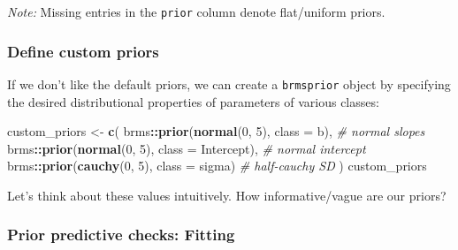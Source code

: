 \documentclass[
  11pt,
]{article}
\newenvironment{Shaded}{\begin{snugshade}}{\end{snugshade}}
\newcommand{\AttributeTok}[1]{\textcolor[rgb]{0.13,0.29,0.53}{#1}}
\newcommand{\CommentTok}[1]{\textcolor[rgb]{0.56,0.35,0.01}{\textit{#1}}}
\newcommand{\DecValTok}[1]{\textcolor[rgb]{0.00,0.00,0.81}{#1}}
\newcommand{\FunctionTok}[1]{\textcolor[rgb]{0.13,0.29,0.53}{\textbf{#1}}}
\newcommand{\NormalTok}[1]{#1}
\newcommand{\OtherTok}[1]{\textcolor[rgb]{0.56,0.35,0.01}{#1}}
\newcommand{\SpecialCharTok}[1]{\textcolor[rgb]{0.81,0.36,0.00}{\textbf{#1}}}
\begin{document}
\emph{Note:} Missing entries in the \texttt{prior} column denote flat/uniform priors.

\hypertarget{define-custom-priors}{%
\subsubsection{Define custom priors}\label{define-custom-priors}}

If we don't like the default priors, we can create a \texttt{brmsprior} object
by specifying the desired distributional properties of parameters of
various classes:

\begin{Shaded}
\begin{Highlighting}[]
\NormalTok{custom\_priors }\OtherTok{\textless{}{-}} \FunctionTok{c}\NormalTok{(}
\NormalTok{  brms}\SpecialCharTok{::}\FunctionTok{prior}\NormalTok{(}\FunctionTok{normal}\NormalTok{(}\DecValTok{0}\NormalTok{, }\DecValTok{5}\NormalTok{), }\AttributeTok{class =}\NormalTok{ b),          }\CommentTok{\# normal slopes}
\NormalTok{  brms}\SpecialCharTok{::}\FunctionTok{prior}\NormalTok{(}\FunctionTok{normal}\NormalTok{(}\DecValTok{0}\NormalTok{, }\DecValTok{5}\NormalTok{), }\AttributeTok{class =}\NormalTok{ Intercept),  }\CommentTok{\# normal intercept}
\NormalTok{  brms}\SpecialCharTok{::}\FunctionTok{prior}\NormalTok{(}\FunctionTok{cauchy}\NormalTok{(}\DecValTok{0}\NormalTok{, }\DecValTok{5}\NormalTok{), }\AttributeTok{class =}\NormalTok{ sigma)       }\CommentTok{\# half{-}cauchy SD}
\NormalTok{)}
\NormalTok{custom\_priors}
\end{Highlighting}
\end{Shaded}

Let's think about these values intuitively. How informative/vague are our priors?

\hypertarget{prior-predictive-checks-fitting}{%
\subsubsection{Prior predictive checks: Fitting}\label{prior-predictive-checks-fitting}}
\end{document}
